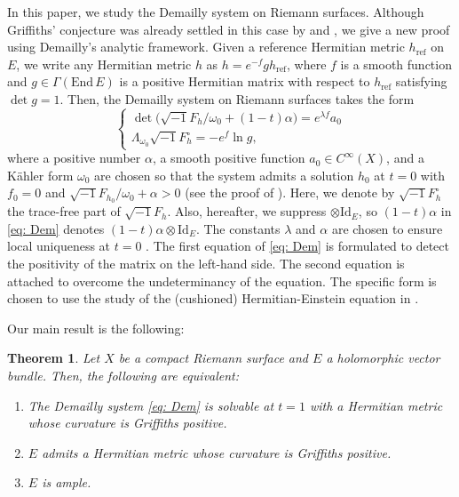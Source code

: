 \documentclass[a4, 12pt, 
]{amsart}
\numberwithin{equation}{section}
\theoremstyle{plain}
\newtheorem{thm}[equation]{Theorem}
\theoremstyle{definition}
\theoremstyle{remark}
\begin{document}
In this paper, we study the Demailly system on Riemann surfaces. Although Griffiths' conjecture was already settled in this case by \cite{Ume, CF} and \cite[Theorem 1.10]{LZZ}, we give a new proof using Demailly's analytic framework.
Given a reference Hermitian metric $h_{\mathrm{ref}}$ on $E$, we write any Hermitian metric $h$ as $h=e^{-f}g h_\mathrm{ref}$, where $f$ is a smooth function and $g \in \Gamma(\mathrm{End}\,E)$ is a positive Hermitian matrix with respect to $h_\mathrm{ref}$ satisfying $\det g=1$. 
Then, the Demailly system on Riemann surfaces takes the form
\begin{equation}\label{eq: Dem}
    \begin{cases}
        \det\big(\sqrt{-1}F_h/\omega_0+(1-t)\alpha\big)=e^{\lambda f} a_0 \\
        \Lambda_{\omega_0}\sqrt{-1}F_h^\circ=-e^f \ln g,
    \end{cases}
\end{equation}
where a positive number $\alpha$, a smooth positive function $a_0\in C^\infty(X)$, and a Kähler form $\omega_0$ are chosen so that the system admits a solution $h_0$ at $t=0$ with $f_0=0$ and $\sqrt{-1}F_{h_0}/\omega_0+\alpha>0$ (see the proof of \cite[Theorem 3.1]{UY}). Here, we denote by $\sqrt{-1}F_h^\circ$ the trace-free part of $\sqrt{-1}F_h$. Also, hereafter, we suppress $\otimes\mathrm{Id}_E$, so $(1-t)\alpha$ in \eqref{eq: Dem} denotes $(1-t)\alpha \otimes\mathrm{Id}_E$.
The constants $\lambda$ and $\alpha$ are chosen to ensure local uniqueness at $t=0$ \cite[Propositions 2.1 and 2.2]{Pin23}. The first equation of \eqref{eq: Dem} is formulated to detect the positivity of the matrix on the left-hand side. The second equation is attached to overcome the undeterminancy of the equation. The specific form is chosen to use the study of the (cushioned) Hermitian-Einstein equation in \cite{UY}.

Our main result is the following:

\begin{thm}\label{thm: main}
    Let $X$ be a compact Riemann surface and $E$ a holomorphic vector bundle. Then, the following are equivalent:
    \begin{enumerate}[font=\normalfont]
        \item\label{item: solv} The Demailly system \eqref{eq: Dem} is solvable at $t=1$ with a Hermitian metric whose curvature is Griffiths positive.
        \item\label{item: Gposi} $E$ admits a Hermitian metric whose curvature is Griffiths positive.
        \item\label{item: ample} $E$ is ample.
    \end{enumerate}
\end{thm}
\end{document}
